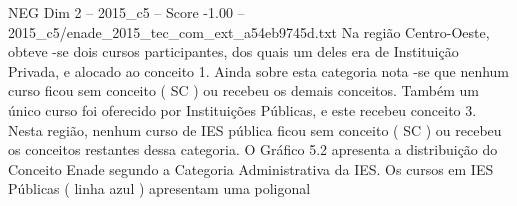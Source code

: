 \begin{textsample}{NEG Dim 2 – 2015\_c5 – Score -1.00 – 2015\_c5/enade\_2015\_tec\_com\_ext\_a54eb9745d.txt}
Na região Centro-Oeste, obteve -se dois cursos participantes, dos quais um deles era de Instituição Privada, e alocado ao conceito 1.
Ainda sobre esta categoria nota -se que nenhum curso ficou sem conceito ( SC ) ou recebeu os demais conceitos.
Também um único curso foi oferecido por Instituições Públicas, e este recebeu conceito 3.
Nesta região, nenhum curso de IES pública ficou sem conceito ( SC ) ou recebeu os conceitos restantes dessa categoria.
O Gráfico 5.2 apresenta a distribuição do Conceito Enade segundo a Categoria Administrativa da IES.
Os cursos em IES Públicas ( linha azul ) apresentam uma poligonal

\end{textsample}
